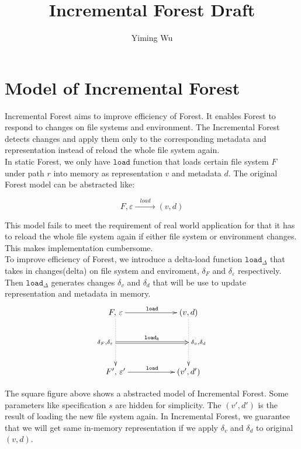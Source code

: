 \documentclass[10pt,twoside,a4paper]{article}
\title{Incremental Forest Draft}
\author{Yiming Wu}
\theoremstyle{theorem}
\theoremstyle{lemma}
\theoremstyle{property}
\theoremstyle{definition}
\theoremstyle{assumption}
\begin{document}
\maketitle

\section{Model of Incremental Forest}

Incremental Forest aims to improve efficiency of Forest. It enables Forest to respond to changes on file systems and environment. 
The Incremental Forest detects changes and apply them only to the corresponding metadata and representation instead of reload the whole file system again. \\

In static Forest, we only have $\mathtt{load}$ function that loads certain file system $F$ under path $r$ into memory as representation $v$ and metadata $d$. The original Forest model can be abstracted like:

\begin{displaymath}
	F,\varepsilon \xrightarrow{\;\;\;load\;\;\;} (v,d) 
\end{displaymath}

This model fails to meet the requirement of real world application for that it has to reload the whole file system again if either file system or environment changes. This makes implementation cumbersome.\\

To improve efficiency of Forest, we introduce a delta-load function $\mathtt{load}_\Delta$ that takes in changes(delta) on file system and enviroment, $\delta_F$ and $\delta_\varepsilon$ respectively. Then $\mathtt{load}_\Delta$ generates changes $\delta_v$ and $\delta_d$ that will be use to update representation and metadata in memory.
\begin{displaymath}
	\xymatrix@=2cm{
	F,\, \varepsilon \ar@{->}[r]^{\mathtt{load}}
	\ar@{..>}[d]_{\delta_F, \delta_\varepsilon}="a"
	& (v,d)\ar@{..>}[d]^{\delta_v, \delta_d}="b"\\
	F',\, \varepsilon' \ar@{->}[r]^{\mathtt{load}}
	& (v',d')
	\ar@{=>}^{\mathtt{load_\Delta}}"a";"b"
	}
\end{displaymath}

The square figure above shows a abstracted model of Incremental Forest. Some parameters like specification $s$ are hidden for simplicity. The $(v',d')$ is the result of loading the new file system again. In Incremental Forest, we guarantee that we will get same in-memory representation if we apply $\delta_v$ and $\delta_d$ to original $(v,d)$.\\
\end{document}
